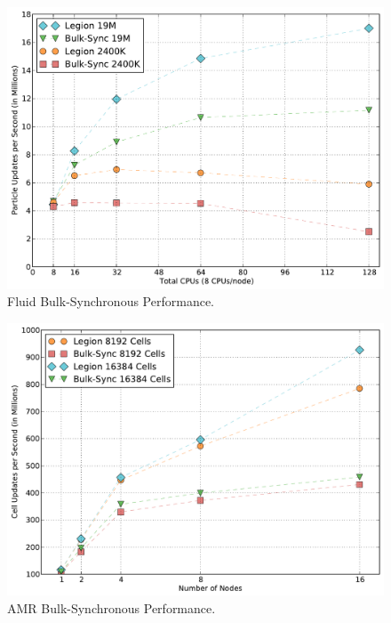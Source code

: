 \begin{figure}
\begin{center}
\includegraphics[scale=0.33]{figs/fluid_bulk_sync.pdf}
\end{center}
\vspace{-6mm}
\caption{Fluid Bulk-Synchronous Performance.\label{fig:fluidbulk}}
\vspace{-4mm}
\end{figure}

\begin{figure}
\begin{center}
\includegraphics[scale=0.33]{figs/amr_bulk_sync.pdf}
\end{center}
\vspace{-6mm}
\caption{AMR Bulk-Synchronous Performance.\label{fig:amrbulk}}
\vspace{-4mm}
\end{figure}


